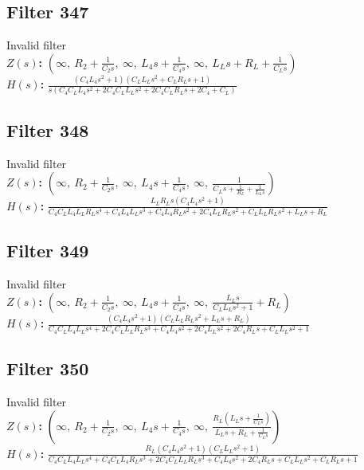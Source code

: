 \documentclass{article}
\begin{document}
\subsection*{Filter 347}
Invalid filter \\ 
\textbf{$Z(s)$:} $\left( \infty, \  R_{2} + \frac{1}{C_{2} s}, \  \infty, \  L_{4} s + \frac{1}{C_{4} s}, \  \infty, \  L_{L} s + R_{L} + \frac{1}{C_{L} s}\right)$ \\ 
\textbf{$H(s)$:} $\frac{\left(C_{4} L_{4} s^{2} + 1\right) \left(C_{L} L_{L} s^{2} + C_{L} R_{L} s + 1\right)}{s \left(C_{4} C_{L} L_{4} s^{2} + 2 C_{4} C_{L} L_{L} s^{2} + 2 C_{4} C_{L} R_{L} s + 2 C_{4} + C_{L}\right)}$ \\ 
\subsection*{Filter 348}
Invalid filter \\ 
\textbf{$Z(s)$:} $\left( \infty, \  R_{2} + \frac{1}{C_{2} s}, \  \infty, \  L_{4} s + \frac{1}{C_{4} s}, \  \infty, \  \frac{1}{C_{L} s + \frac{1}{R_{L}} + \frac{1}{L_{L} s}}\right)$ \\ 
\textbf{$H(s)$:} $\frac{L_{L} R_{L} s \left(C_{4} L_{4} s^{2} + 1\right)}{C_{4} C_{L} L_{4} L_{L} R_{L} s^{4} + C_{4} L_{4} L_{L} s^{3} + C_{4} L_{4} R_{L} s^{2} + 2 C_{4} L_{L} R_{L} s^{2} + C_{L} L_{L} R_{L} s^{2} + L_{L} s + R_{L}}$ \\ 
\subsection*{Filter 349}
Invalid filter \\ 
\textbf{$Z(s)$:} $\left( \infty, \  R_{2} + \frac{1}{C_{2} s}, \  \infty, \  L_{4} s + \frac{1}{C_{4} s}, \  \infty, \  \frac{L_{L} s}{C_{L} L_{L} s^{2} + 1} + R_{L}\right)$ \\ 
\textbf{$H(s)$:} $\frac{\left(C_{4} L_{4} s^{2} + 1\right) \left(C_{L} L_{L} R_{L} s^{2} + L_{L} s + R_{L}\right)}{C_{4} C_{L} L_{4} L_{L} s^{4} + 2 C_{4} C_{L} L_{L} R_{L} s^{3} + C_{4} L_{4} s^{2} + 2 C_{4} L_{L} s^{2} + 2 C_{4} R_{L} s + C_{L} L_{L} s^{2} + 1}$ \\ 
\subsection*{Filter 350}
Invalid filter \\ 
\textbf{$Z(s)$:} $\left( \infty, \  R_{2} + \frac{1}{C_{2} s}, \  \infty, \  L_{4} s + \frac{1}{C_{4} s}, \  \infty, \  \frac{R_{L} \left(L_{L} s + \frac{1}{C_{L} s}\right)}{L_{L} s + R_{L} + \frac{1}{C_{L} s}}\right)$ \\ 
\textbf{$H(s)$:} $\frac{R_{L} \left(C_{4} L_{4} s^{2} + 1\right) \left(C_{L} L_{L} s^{2} + 1\right)}{C_{4} C_{L} L_{4} L_{L} s^{4} + C_{4} C_{L} L_{4} R_{L} s^{3} + 2 C_{4} C_{L} L_{L} R_{L} s^{3} + C_{4} L_{4} s^{2} + 2 C_{4} R_{L} s + C_{L} L_{L} s^{2} + C_{L} R_{L} s + 1}$ \\ 
\end{document}
